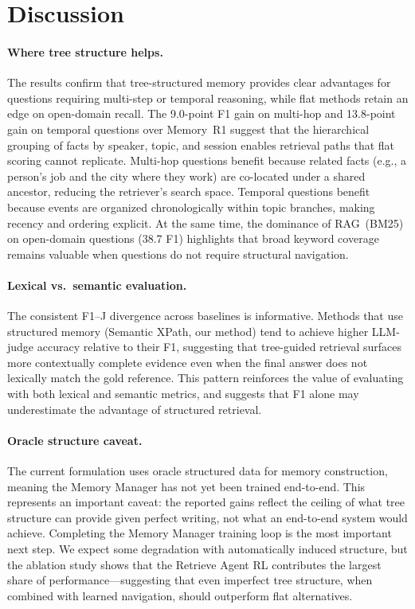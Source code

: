 \section{Discussion}
\paragraph{Where tree structure helps.}
The results confirm that tree-structured memory provides clear advantages for questions requiring multi-step or temporal reasoning, while flat methods retain an edge on open-domain recall. The 9.0-point F1 gain on multi-hop and 13.8-point gain on temporal questions over Memory~R1 suggest that the hierarchical grouping of facts by speaker, topic, and session enables retrieval paths that flat scoring cannot replicate. Multi-hop questions benefit because related facts (e.g., a person's job and the city where they work) are co-located under a shared ancestor, reducing the retriever's search space. Temporal questions benefit because events are organized chronologically within topic branches, making recency and ordering explicit. At the same time, the dominance of RAG~(BM25) on open-domain questions (38.7 F1) highlights that broad keyword coverage remains valuable when questions do not require structural navigation.

\paragraph{Lexical vs.\ semantic evaluation.}
The consistent F1--J divergence across baselines is informative. Methods that use structured memory (Semantic XPath, our method) tend to achieve higher LLM-judge accuracy relative to their F1, suggesting that tree-guided retrieval surfaces more contextually complete evidence even when the final answer does not lexically match the gold reference. This pattern reinforces the value of evaluating with both lexical and semantic metrics, and suggests that F1 alone may underestimate the advantage of structured retrieval.

\paragraph{Oracle structure caveat.}
The current formulation uses oracle structured data for memory construction, meaning the Memory Manager has not yet been trained end-to-end. This represents an important caveat: the reported gains reflect the ceiling of what tree structure can provide given perfect writing, not what an end-to-end system would achieve. Completing the Memory Manager training loop is the most important next step. We expect some degradation with automatically induced structure, but the ablation study shows that the Retrieve Agent RL contributes the largest share of performance---suggesting that even imperfect tree structure, when combined with learned navigation, should outperform flat alternatives.

